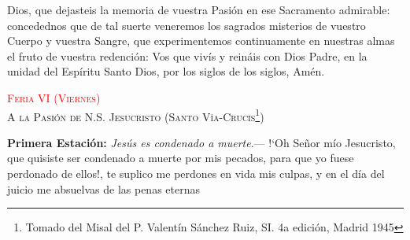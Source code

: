 \documentclass[10pt]{article}
\begin{document}
\begin{multicols}{2}
      \vspace{2mm}

      Dios, que dejasteis la memoria de vuestra Pasión en ese Sacramento admirable: concedednos que de tal suerte veneremos los sagrados misterios de vuestro Cuerpo 
      y vuestra Sangre, que experimentemos continuamente en nuestras almas el fruto de vuestra redención: Vos que vivís y reináis con Dios Padre, en la unidad del Espíritu Santo Dios, 
      por los siglos de los siglos, Amén.


      \begin{center}
            \textsc{\textcolor{red}{Feria VI (Viernes)}\\ {\large A la Pasión de N.S. Jesucristo (Santo Vía-Crucis\footnote{Tomado del Misal del P. Valentín Sánchez Ruiz, SI. 4a edición, Madrid 1945})}}
      \end{center}

      

      \vspace{2mm}

      

      \vspace{2mm}

      \textbf{Primera Estación:} \textit{Jesús es condenado a muerte}.--- {!`}Oh Señor mío Jesucristo, que quisiste ser condenado a muerte por mis pecados, 
      para que yo fuese perdonado de ellos!, te suplico me perdones en vida mis culpas, y en el día del juicio me absuelvas de las penas eternas

      \vspace{2mm}

      \begin{otherlanguage}{latin}
            

            \vspace{1mm}

            

            \vspace{1mm}

            
      \end{otherlanguage}

      \vspace{1mm}


\end{multicols}
\end{document}
